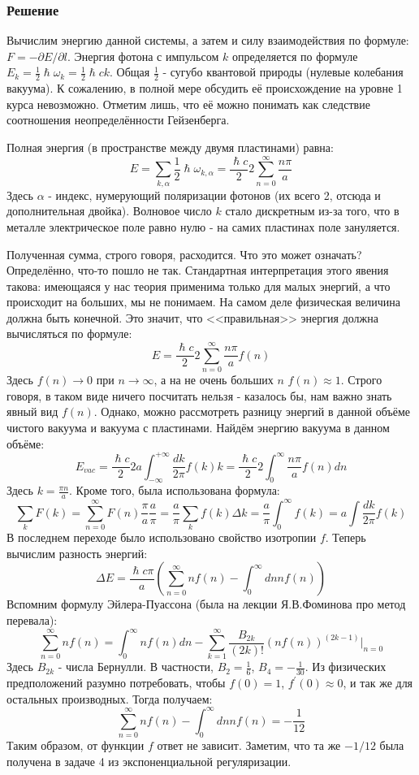 \documentclass[a4paper,12pt]{article}
\begin{document}
\subsubsection*{Решение}
Вычислим энергию данной системы, а затем и силу взаимодействия по формуле: $F=-\partial E/\partial l$. Энергия фотона с импульсом $k$ определяется по формуле $E_{k}=\frac{1}{2}\hslash\omega_k=\frac{1}{2}\hslash ck$. Общая $\frac{1}{2}$ - сугубо квантовой природы (нулевые колебания вакуума). К сожалению, в полной мере обсудить её происхождение на уровне 1 курса невозможно. Отметим лишь, что её можно понимать как следствие соотношения неопределённости Гейзенберга.

\noindent
Полная энергия (в пространстве между двумя пластинами) равна:
$$
E=\sum_{k,\alpha}\frac{1}{2}\hslash\omega_{k,\alpha}=\frac{\hslash c}{2}2\sum_{n=0}^{\infty}\frac{n\pi}{a}
$$
Здесь $\alpha$ - индекс, нумерующий поляризации фотонов (их всего 2, отсюда и дополнительная двойка). Волновое число $k$ стало дискретным из-за того, что в металле электрическое поле равно нулю - на самих пластинах поле зануляется.

\noindent
Полученная сумма, строго говоря, расходится. Что это может означать? Определённо, что-то пошло не так. Стандартная интерпретация этого явения такова: имеющаяся у нас теория применима только для малых энергий, а что происходит на больших, мы не понимаем. На самом деле физическая величина должна быть конечной. Это значит, что <<правильная>> энергия должна вычисляться по формуле:
$$
E=\frac{\hslash c}{2}2\sum_{n=0}^{\infty}\frac{n\pi}{a}f(n)
$$
Здесь $f(n)\to0$ при $n\to\infty$, а на не очень больших $n$ $f(n)\approx1$. Строго говоря, в таком виде ничего посчитать нельзя - казалось бы, нам важно знать явный вид $f(n)$. Однако, можно рассмотреть разницу энергий в данной объёме чистого вакуума и вакуума с пластинами. Найдём энергию вакуума в данном объёме:
$$
E_{vac}=\frac{\hslash c}{2}2 a\int_{-\infty}^{+\infty}\frac{dk}{2\pi}f(k)k= \frac{\hslash c}{2}2\int_0^{\infty}\frac{n\pi}{a}f(n)dn
$$
Здесь $k=\frac{\pi n}{a}$. Кроме того, была использована формула:
$$
\sum_{k}F(k)=\sum_{n=0}^{\infty}F(n)\frac{\pi}{a}\frac{a}{\pi}=\frac{a}{\pi}\sum_{k}f(k)\Delta k=\frac{a}{\pi}\int_0^{\infty}f(k)=a\int\frac{dk}{2\pi}f(k)
$$
В последнем переходе было использовано свойство изотропии $f$. Теперь вычислим разность энергий:
$$
\Delta E=\frac{\hslash c\pi}{a}\left(\sum_{n=0}^{\infty}nf(n)-\int_0^{\infty}dn nf(n)\right)
$$
Вспомним формулу Эйлера-Пуассона (была на лекции Я.В.Фоминова про метод перевала):
$$
\sum_{n=0}^{\infty}nf(n)=\int_{0}^{\infty}nf(n)dn-\sum_{k=1}^{\infty}\frac{B_{2k}}{(2k)!}\left(nf(n)\right)^{(2k-1)}\vert_{n=0}
$$
Здесь $B_{2k}$ - числа Бернулли. В частности, $B_2=\frac{1}{6}$, $B_4=-\frac{1}{30}$. Из физических предположений разумно потребовать, чтобы $f(0)=1$, $f^{'}(0)\approx0$, и так же для остальных производных. Тогда получаем:
$$
\sum_{n=0}^{\infty}nf(n)-\int_0^{\infty}dn nf(n)=-\frac{1}{12}
$$
Таким образом, от функции $f$ ответ не зависит. Заметим, что та же $-1/12$ была получена в задаче 4 из экспоненциальной регуляризации.
\end{document}

